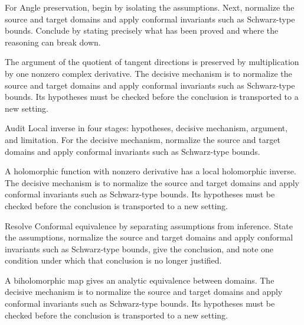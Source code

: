 \begin{problem}\label{prob:iv17-problem-02}
For Angle preservation, begin by isolating the assumptions. Next, normalize the source and target domains and apply conformal invariants such as Schwarz-type bounds. Conclude by stating precisely what has been proved and where the reasoning can break down.
\end{problem}
\begin{solution}
The argument of the quotient of tangent directions is preserved by multiplication by one nonzero complex derivative. The decisive mechanism is to normalize the source and target domains and apply conformal invariants such as Schwarz-type bounds. Its hypotheses must be checked before the conclusion is transported to a new setting.
\end{solution}

\begin{problem}\label{prob:iv17-problem-03}
Audit Local inverse in four stages: hypotheses, decisive mechanism, argument, and limitation. For the decisive mechanism, normalize the source and target domains and apply conformal invariants such as Schwarz-type bounds.
\end{problem}
\begin{solution}
A holomorphic function with nonzero derivative has a local holomorphic inverse. The decisive mechanism is to normalize the source and target domains and apply conformal invariants such as Schwarz-type bounds. Its hypotheses must be checked before the conclusion is transported to a new setting.
\end{solution}

\begin{problem}\label{prob:iv17-problem-04}
Resolve Conformal equivalence by separating assumptions from inference. State the assumptions, normalize the source and target domains and apply conformal invariants such as Schwarz-type bounds, give the conclusion, and note one condition under which that conclusion is no longer justified.
\end{problem}
\begin{solution}
A biholomorphic map gives an analytic equivalence between domains. The decisive mechanism is to normalize the source and target domains and apply conformal invariants such as Schwarz-type bounds. Its hypotheses must be checked before the conclusion is transported to a new setting.
\end{solution}

